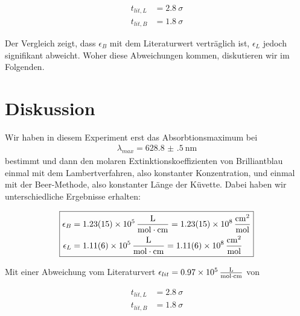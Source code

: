 \documentclass{article}
\begin{document}
\begin{equation}
	\boxed{
		\begin{aligned}
			t_{lit,L}  &=  \qty{2.8}{\sigma}\\
			t_{lit, B} &= \qty{1.8}{\sigma}
		\end{aligned}
	}
\end{equation}

Der Vergleich zeigt, dass $\epsilon_B$ mit dem Literaturwert verträglich ist, $\epsilon_L$ jedoch
signifikant abweicht. Woher diese Abweichungen kommen, diskutieren wir im Folgenden.


\section{Diskussion}
\label{sec:diskussion}

Wir haben in diesem Experiment erst das Absorbtionsmaximum bei
\begin{equation}
	\boxed{
		\begin{aligned}
			\lambda_{max} = \qty{628.8(5)}{\nano\meter}
		\end{aligned}
	}
\end{equation}
bestimmt und dann den molaren Extinktionskoeffizienten von Brilliantblau
einmal mit dem Lambertverfahren, also konstanter Konzentration, und einmal mit der
Beer-Methode, also konstanter Länge der Küvette. Dabei haben wir unterschiedliche Ergebnisse 
erhalten:

\begin{equation}
	\boxed{
		\begin{aligned}
			\epsilon_B &= \qty{1.23(.15)e5}{\frac{\liter}{\mol \cdot cm}}= \qty{1.23(15)e8}{\frac{cm^2}{\mol}}\\
			\epsilon_L &= \SI{1.11(6)e5}{\frac{\liter}{\mol \cdot cm}} = \qty{1.11(6)e8}{\frac{cm^2}{\mol}}
		\end{aligned}
	}
\end{equation}

Mit einer Abweichung vom Literaturvert $\epsilon_{lit} = \qty{.97e5}{\frac{\liter}{\mol \cdot cm}}$
von

\begin{equation}
	\boxed{
		\begin{aligned}
			t_{lit,L}  &=  \qty{2.8}{\sigma}\\
			t_{lit, B} &= \qty{1.8}{\sigma}
		\end{aligned}
	}
\end{equation}
\end{document}
